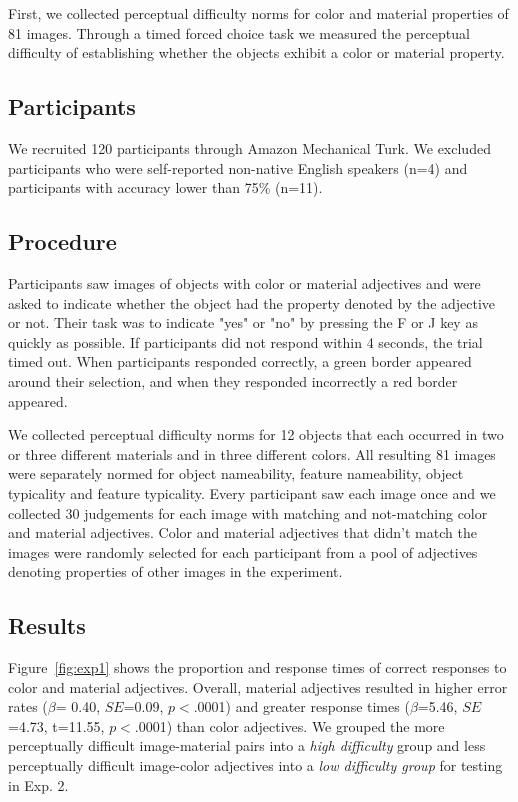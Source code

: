 \documentclass[12pt,letterpaper]{article}
\begin{document}
First, we collected perceptual difficulty norms for color and material properties of 81 images. Through a timed forced choice task we measured the perceptual difficulty of establishing whether the objects exhibit a color or material property.

\subsection{Participants} 

We recruited 120 participants through Amazon Mechanical Turk. We excluded participants who were self-reported non-native English speakers (n=4) and participants with accuracy lower than 75\% (n=11).

\subsection{Procedure} 

Participants saw images of objects with color or material adjectives and were asked to indicate whether the object had the property denoted by the adjective or not. Their task was to indicate "yes" or "no" by pressing the F or J key as quickly as possible. If participants did not respond within 4 seconds, the trial timed out. When participants responded correctly, a green border appeared around their selection, and when they responded incorrectly a red border appeared.

We collected perceptual difficulty norms for 12 objects that each occurred in two or three different materials and in three different colors. All resulting 81 images were separately normed for object nameability, feature nameability, object typicality and feature typicality. Every participant saw each image once and we collected 30 judgements for each image with matching and not-matching color and material adjectives. Color and material adjectives that didn't match the images were randomly selected for each participant from a pool of adjectives denoting properties of other images in the experiment.

\subsection{Results} 

Figure~\ref{fig:exp1} shows the proportion and response times of correct responses to color and material adjectives. Overall, material adjectives resulted in higher error rates ($\beta$= 0.40, $SE$=0.09, $p$$<$.0001) and greater response times ($\beta$=5.46, $SE$=4.73, t=11.55, $p$$<$.0001) than color adjectives. We grouped the more perceptually difficult image-material pairs into a \textit{high difficulty} group and less perceptually difficult image-color adjectives into a \textit{low difficulty group} for testing in Exp. 2.
\end{document}
